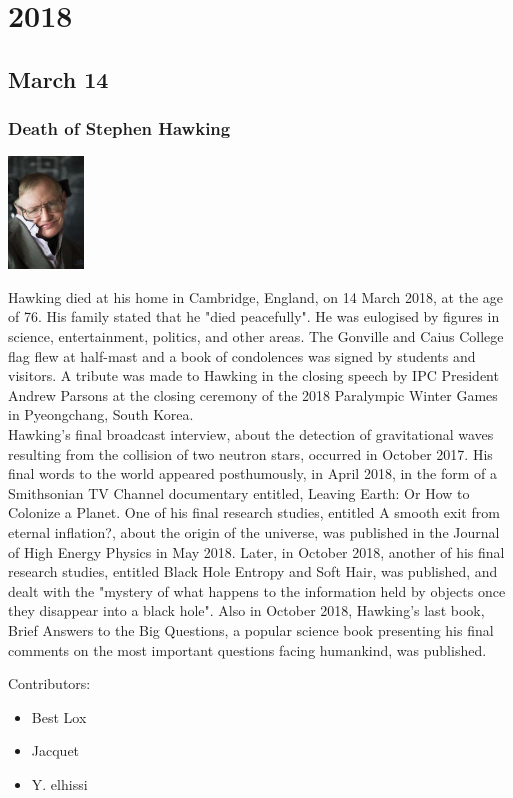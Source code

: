 \documentclass[11pt]{report}
\begin{document}
\chapter{2018}
\section{March 14}
\subsection{Death of Stephen Hawking}
\vspace{2mm}\begin{center}\includegraphics[width=2cm]{./img/stephenHawking.jpg}\end{center}
Hawking died at his home in Cambridge, England, on 14 March 2018, at the age of 76. His family stated that he "died peacefully". He was eulogised by figures in science, entertainment, politics, and other areas. The Gonville and Caius College flag flew at half-mast and a book of condolences was signed by students and visitors. A tribute was made to Hawking in the closing speech by IPC President Andrew Parsons at the closing ceremony of the 2018 Paralympic Winter Games in Pyeongchang, South Korea.\\
\indent Hawking's final broadcast interview, about the detection of gravitational waves resulting from the collision of two neutron stars, occurred in October 2017. His final words to the world appeared posthumously, in April 2018, in the form of a Smithsonian TV Channel documentary entitled, Leaving Earth: Or How to Colonize a Planet. One of his final research studies, entitled A smooth exit from eternal inflation?, about the origin of the universe, was published in the Journal of High Energy Physics in May 2018. Later, in October 2018, another of his final research studies, entitled Black Hole Entropy and Soft Hair, was published, and dealt with the "mystery of what happens to the information held by objects once they disappear into a black hole". Also in October 2018, Hawking's last book, Brief Answers to the Big Questions, a popular science book presenting his final comments on the most important questions facing humankind, was published.

\pagebreak
Contributors: 
\begin{itemize}
\item Best Lox
\item Jacquet
\item Y. elhissi
\end{itemize}
\end{document}
